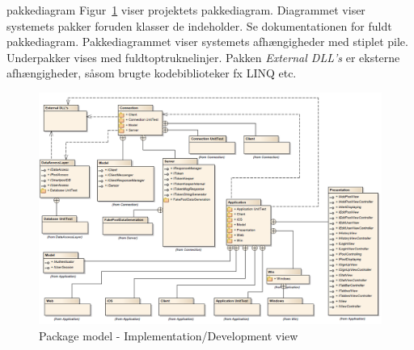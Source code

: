 pakkediagram
Figur~\ref{fig:packageDiagram} viser projektets pakkediagram. Diagrammet viser systemets pakker foruden klasser de indeholder. Se dokumentationen for fuldt pakkediagram. Pakkediagrammet viser systemets afhængigheder med stiplet pile. Underpakker vises med fuldtoptruknelinjer. Pakken \textit{External DLL's} er eksterne afhængigheder, såsom brugte kodebiblioteker fx LINQ etc.

\begin{landscape}
	\begin{figure}[H]
		\centering
		\includegraphics[width=\linewidth]{figs/arkitektur/packageDiagramNoImpl.PNG}
		\caption{Package model - Implementation/Development view}
		\label{fig:packageDiagram}
	\end{figure}
\end{landscape}
